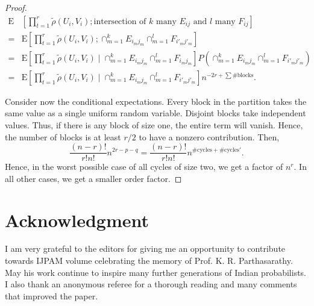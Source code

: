 \documentclass{amsart}
\newcommand{\E}{\mathrm{E}}
\begin{document}
{\begin{proof}
\[
\begin{split}
\E&\left[ \prod_{t=1}^r \tilde{\rho}(U_i, V_i); \text{intersection of $k$ many $E_{ij}$ and $l$ many $F_{ij}$}  \right]\\
=&\E\left[ \prod_{t=1}^r \tilde{\rho}(U_i, V_i);  \cap_{m=1}^k E_{i_mj_m} \cap_{m=1}^l F_{i'_mj'_m} \right] \\
=& \E\left[ \prod_{t=1}^r \tilde{\rho}(U_i, V_i) \mid   \cap_{m=1}^k E_{i_mj_m} \cap_{m=1}^l F_{i_mj_m} \right] P\left( \cap_{m=1}^k E_{i_mj_m} \cap_{m=1}^l F_{i'_mj'_m} \right)\\
=& \E\left[ \prod_{t=1}^r \tilde{\rho}(U_i, V_i) \mid   \cap_{m=1}^k E_{i_mj_m} \cap_{m=1}^l F_{i'_mj'_m} \right] n^{-2r + \sum \#\text{blocks}}.
\end{split}
\]

Consider now the conditional expectations. Every block in the partition takes the same value as a single uniform random variable. Disjoint blocks take independent values. Thus, if there is any block of size one, the entire term will vanish. Hence, the number of blocks is at least $r/2$ to have a nonzero contribution. Then,
\[
\frac{(n-r)!}{r! n!} n^{2r-p-q}= \frac{(n-r)!}{r! n!} n^{\#\text{cycles}+ \#\text{cycles}'}.
\]
Hence, in the worst possible case of all cycles of size two, we get a factor of $n^r$. In all other cases, we get a smaller order factor. 

  
\end{proof}

}

\section{Acknowledgment} I am very grateful to the editors for giving me an opportunity to contribute towards IJPAM volume celebrating the memory of Prof. K. R. Parthasarathy. May his work continue to inspire many further generations of Indian probabilists. I also thank an anonymous referee for a thorough reading and many comments that improved the paper. 





\end{document}
